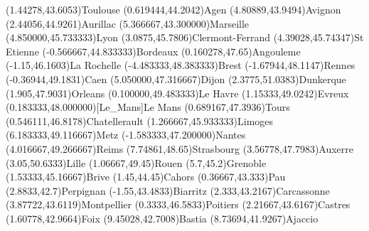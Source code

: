 \mapput[90](1.44278,43.6053){Toulouse}
\mapput[90](0.619444,44.2042){Agen}
\mapput[90](4.80889,43.9494){Avignon}
\mapput[90](2.44056,44.9261){Aurillac}
\mapput[90](5.366667,43.300000){Marseille}
\mapput[0](4.850000,45.733333){Lyon}
\mapput[-90](3.0875,45.7806){Clermont-Ferrand}
\mapput[90](4.39028,45.74347){St Etienne}
\mapput[90](-0.566667,44.833333){Bordeaux}
\mapput[90](0.160278,47.65){Angouleme}
\mapput[90](-1.15,46.1603){La Rochelle}
\mapput[90](-4.483333,48.383333){Brest}
\mapput[90](-1.67944,48.1147){Rennes}
\mapput[-90](-0.36944,49.1831){Caen}
\mapput[90](5.050000,47.316667){Dijon}
\mapput[30](2.3775,51.0383){Dunkerque}
\mapput[90](1.905,47.9031){Orleans}
\mapput[180](0.100000,49.483333){Le Havre}
\mapput[90](1.15333,49.0242){Evreux}
\mapput[90](0.183333,48.000000)[Le_Mans]{Le Mans}
\mapput[90](0.689167,47.3936){Tours}
\mapput[90](0.546111,46.8178){Chatellerault}
\mapput[90](1.266667,45.933333){Limoges}
\mapput[90](6.183333,49.116667){Metz}
\mapput[90](-1.583333,47.200000){Nantes}
\mapput[90](4.016667,49.266667){Reims}
\mapput[30](7.74861,48.65){Strasbourg}
\mapput[30](3.56778,47.7983){Auxerre}
\mapput[90](3.05,50.6333){Lille}
\mapput[90](1.06667,49.45){Rouen}
\mapput[90](5.7,45.2){Grenoble}
\mapput[90](1.53333,45.16667){Brive}
\mapput[90](1.45,44.45){Cahors}
\mapput[90](0.36667,43.333){Pau}
\mapput[90](2.8833,42.7){Perpignan}
\mapput[90](-1.55,43.4833){Biarritz}
\mapput[90](2.333,43.2167){Carcassonne}
\mapput[90](3.87722,43.6119){Montpellier}
\mapput[90](0.3333,46.5833){Poitiers}
\mapput[0](2.21667,43.6167){Castres}
\mapput[90](1.60778,42.9664){Foix}
\mapput[90](9.45028,42.7008){Bastia}
\mapput[90](8.73694,41.9267){Ajaccio}
\endinput 